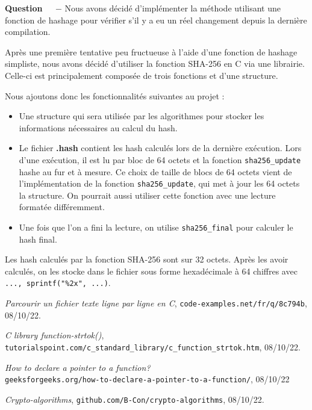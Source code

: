\documentclass[11pt]{article}
\newcounter{question}[section]
\newenvironment{question}[1][]{\refstepcounter{question}\par\medskip
   \noindent\textbf{Question~\thequestion ~ $-$} \rmfamily}{}
\begin{document}
\begin{question} Nous avons décidé d'implémenter la méthode utilisant une fonction de hashage pour vérifier s'il y a eu un réel changement depuis la dernière compilation.

	Après une première tentative peu fructueuse à l'aide d'une fonction de hashage simpliste, nous avons décidé d'utiliser
	la fonction SHA-256 en C\cite{hash} via une librairie. Celle-ci est principalement composée de trois fonctions et d'une structure.
	
Nous ajoutons donc les fonctionnalités suivantes au projet :

	\begin{itemize}
		\item Une structure qui sera utilisée par les algorithmes pour stocker les informations nécessaires au calcul du hash.
		\item Le fichier \textbf{.hash} contient les hash calculés lors de la dernière exécution. Lors d'une exécution, il est lu par bloc de 64 octets et la fonction \texttt{sha256\_update} hashe au fur et à mesure.
		Ce choix de taille de blocs de 64 octets vient de l'implémentation de la fonction \texttt{sha256\_update}, qui met à jour les 64 octets la structure. On pourrait aussi utiliser cette fonction avec une lecture formatée différemment.
		\item Une fois que l'on a fini la lecture, on utilise \texttt{sha256\_final} pour calculer le hash final.
	\end{itemize}

	Les hash calculés par la fonction SHA-256 sont sur 32 octets. Après les avoir calculés, on les stocke dans le fichier sous forme hexadécimale à 64 chiffres avec \texttt{..., sprintf("\%2x", ...)}.

\end{question}



\begin{thebibliography}{99}
  \textit{Parcourir un fichier texte ligne par ligne en C},
  \texttt{code-examples.net/fr/q/8c794b},
  08/10/22.

  \textit{C library function-strtok()},
  \texttt{\\tutorialspoint.com/c\_standard\_library/c\_function\_strtok.htm},
  08/10/22.

  \textit{How to declare a pointer to a function?}
  \texttt{\\geeksforgeeks.org/how-to-declare-a-pointer-to-a-function/}, 
  08/10/22
  
  \textit{Crypto-algorithms},
  \texttt{github.com/B-Con/crypto-algorithms},
  08/10/22.


\end{thebibliography}
\end{document}
